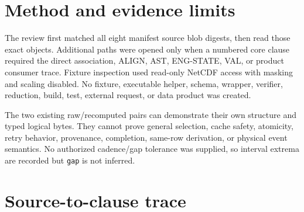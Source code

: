 \documentclass[11pt]{article}
\newcommand{\code}[1]{\texttt{#1}}
\begin{document}
\section{Method and evidence limits}

The review first matched all eight manifest source blob digests, then read
those exact objects.  Additional paths were opened only when a numbered core
clause required the direct association, ALIGN, AST, ENG-STATE, VAL, or product
consumer trace.  Fixture inspection used read-only NetCDF access with masking
and scaling disabled.  No fixture, executable helper, schema, wrapper,
verifier, reduction, build, test, external request, or data product was
created.

The two existing raw/recomputed pairs can demonstrate their own structure and
typed logical bytes.  They cannot prove general selection, cache safety,
atomicity, retry behavior, provenance, completion, same-row derivation, or
physical event semantics.  No authorized cadence/gap tolerance was supplied,
so interval extrema are recorded but \code{gap} is not inferred.

\section{Source-to-clause trace}
\end{document}
